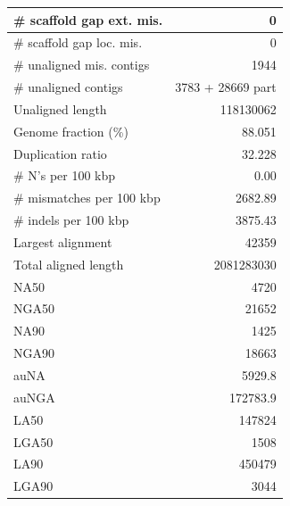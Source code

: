\documentclass[12pt,a4paper]{article}
\begin{document}
\begin{table}[ht]
\begin{center}
\begin{tabular}{|l*{1}{|r}|}
\# scaffold gap ext. mis. & 0 \\ \hline
\# scaffold gap loc. mis. & 0 \\ \hline
\# unaligned mis. contigs & 1944 \\ \hline
\# unaligned contigs & 3783 + 28669 part \\ \hline
Unaligned length & 118130062 \\ \hline
Genome fraction (\%) & 88.051 \\ \hline
Duplication ratio & 32.228 \\ \hline
\# N's per 100 kbp & 0.00 \\ \hline
\# mismatches per 100 kbp & 2682.89 \\ \hline
\# indels per 100 kbp & 3875.43 \\ \hline
Largest alignment & 42359 \\ \hline
Total aligned length & 2081283030 \\ \hline
NA50 & 4720 \\ \hline
NGA50 & 21652 \\ \hline
NA90 & 1425 \\ \hline
NGA90 & 18663 \\ \hline
auNA & 5929.8 \\ \hline
auNGA & 172783.9 \\ \hline
LA50 & 147824 \\ \hline
LGA50 & 1508 \\ \hline
LA90 & 450479 \\ \hline
LGA90 & 3044 \\ \hline
\end{tabular}
\end{center}
\end{table}
\end{document}
